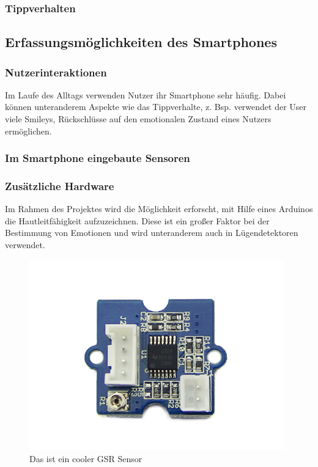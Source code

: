 \subsubsection{Tippverhalten}
\subsection{Erfassungsmöglichkeiten des Smartphones}
\subsubsection{Nutzerinteraktionen}
Im Laufe des Alltags verwenden Nutzer ihr Smartphone sehr häufig. Dabei können unteranderem Aspekte wie das Tippverhalte, 
z. Bsp. verwendet der User viele Smileys, Rückschlüsse auf den emotionalen Zustand eines Nutzers ermöglichen.
\subsubsection{Im Smartphone eingebaute Sensoren}
\subsubsection{Zusätzliche Hardware}
Im Rahmen des Projektes wird die Möglichkeit erforscht, mit Hilfe eines Arduinos die Hautleitfähigkeit aufzuzeichnen. 
Diese ist ein großer Faktor bei der Bestimmung von Emotionen und wird unteranderem auch in Lügendetektoren verwendet. 
\begin{figure}[h]
	\centering
	\includegraphics[width=11cm]{Bilder/sensor.jpg}
	\caption{Das ist ein cooler GSR Sensor}
\end{figure}%